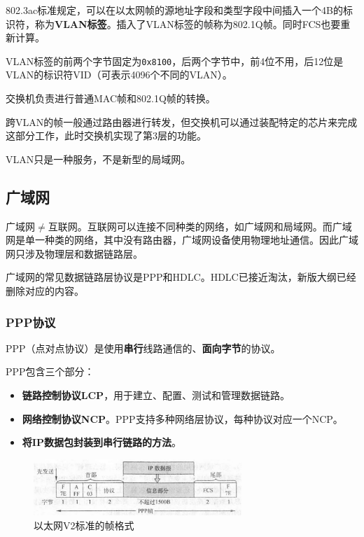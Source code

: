 \documentclass[12pt, a4paper, oneside]{ctexart}
\begin{document}
802.3ac标准规定，可以在以太网帧的源地址字段和类型字段中间插入一个4B的标识符，称为\textbf{VLAN标签}。插入了VLAN标签的帧称为802.1Q帧。同时FCS也要重新计算。

VLAN标签的前两个字节固定为\verb|0x8100|，后两个字节中，前4位不用，后12位是VLAN的标识符VID（可表示4096个不同的VLAN）。

交换机负责进行普通MAC帧和802.1Q帧的转换。

跨VLAN的帧一般通过路由器进行转发，但交换机可以通过装配特定的芯片来完成这部分工作，此时交换机实现了第3层的功能。

VLAN只是一种服务，不是新型的局域网。

\subsection{广域网}

广域网$\neq$互联网。互联网可以连接不同种类的网络，如广域网和局域网。而广域网是单一种类的网络，其中没有路由器，广域网设备使用物理地址通信。因此广域网只涉及物理层和数据链路层。

广域网的常见数据链路层协议是PPP和HDLC。HDLC已接近淘汰，新版大纲已经删除对应的内容。

\subsubsection{PPP协议}

PPP（点对点协议）是使用\textbf{串行}线路通信的、\textbf{面向字节}的协议。

PPP包含三个部分：
\begin{itemize}
    \item {\bf 链路控制协议LCP}，用于建立、配置、测试和管理数据链路。
    \item {\bf 网络控制协议NCP}。PPP支持多种网络层协议，每种协议对应一个NCP。
    \item {\bf 将IP数据包封装到串行链路的方法}。
\end{itemize}

\begin{figure}[h]
    \centering
    \includegraphics[width=0.7\textwidth]{./images/ppp-frame.jpg}
    \caption{以太网V2标准的帧格式}
    \label{ppp-frame}
\end{figure}
\end{document}
